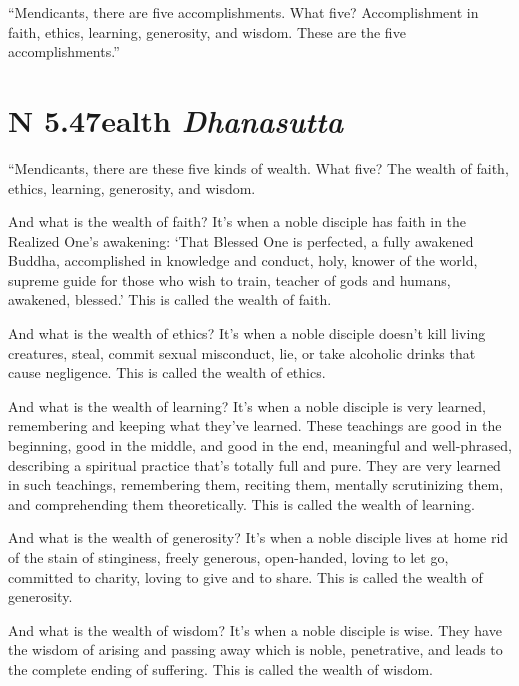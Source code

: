 \documentclass[12pt,openany]{book}%
\newcommand*{\suttatitleacronym}[1]{\smaller[2]{#1}\vspace*{.3em}}
\newcommand*{\suttatitletranslation}[1]{\linebreak{#1}}
\newcommand*{\suttatitleroot}[1]{\linebreak\smaller[2]\itshape{#1}}
\newcommand*{\tocacronym}[1]{\hspace*{-3.3em}{#1}\quad}
\newcommand*{\toctranslation}[1]{#1}
\newcommand*{\tocroot}[1]{(\textit{#1})}
\begin{document}
“Mendicants, there are five accomplishments. What five? Accomplishment in faith, ethics, learning, generosity, and wisdom. These are the five accomplishments.” 

%
\section*{{\suttatitleacronym AN 5.47}{\suttatitletranslation Wealth }{\suttatitleroot Dhanasutta}}
\addcontentsline{toc}{section}{\tocacronym{AN 5.47} \toctranslation{Wealth } \tocroot{Dhanasutta}}

“Mendicants, there are these five kinds of wealth. What five? The wealth of faith, ethics, learning, generosity, and wisdom. 

And what is the wealth of faith? It’s when a noble disciple has faith in the Realized One’s awakening: ‘That Blessed One is perfected, a fully awakened Buddha, accomplished in knowledge and conduct, holy, knower of the world, supreme guide for those who wish to train, teacher of gods and humans, awakened, blessed.’ This is called the wealth of faith. 

And what is the wealth of ethics? It’s when a noble disciple doesn’t kill living creatures, steal, commit sexual misconduct, lie, or take alcoholic drinks that cause negligence. This is called the wealth of ethics. 

And what is the wealth of learning? It’s when a noble disciple is very learned, remembering and keeping what they’ve learned. These teachings are good in the beginning, good in the middle, and good in the end, meaningful and well-phrased, describing a spiritual practice that’s totally full and pure. They are very learned in such teachings, remembering them, reciting them, mentally scrutinizing them, and comprehending them theoretically. This is called the wealth of learning. 

And what is the wealth of generosity? It’s when a noble disciple lives at home rid of the stain of stinginess, freely generous, open-handed, loving to let go, committed to charity, loving to give and to share. This is called the wealth of generosity. 

And what is the wealth of wisdom? It’s when a noble disciple is wise. They have the wisdom of arising and passing away which is noble, penetrative, and leads to the complete ending of suffering. This is called the wealth of wisdom. 
\end{document}
